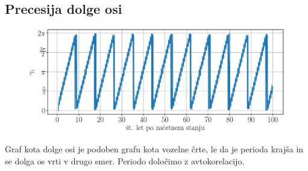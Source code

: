 \documentclass[a4paper,12pt]{article}
\begin{document}
\renewcommand{\figurename}{Graf}

\newpage

\subsection{Precesija dolge osi}

\begin{figure}[h!]
    \centering
    \includegraphics[scale=0.53]{slikep/apsidal-angle.eps}
    \label{fig:apsidal-angle}
\end{figure}

\noindent
Graf kota dolge osi je podoben grafu kota vozelne črte, le da je perioda
krajša in se dolga os vrti v drugo smer. Periodo določimo z avtokorelacijo.
\end{document}
